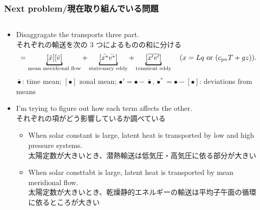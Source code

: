 \documentclass[aspectratio=149,9pt,fleqn,tbtags]{beamer}
\newcommand{\jp}[1]{{\footnotesize #1}}
\begin{document}
\begin{frame}
	\frametitle{Next problem/現在取り組んでいる問題}
	\begin{columns}[T]
		\begin{column}{\textwidth}
			\begin{itemize}
				\item Disaggragate the transports three part.\\
					\jp{それぞれの輸送を次の 3 つによるものの和に分ける}
					\begin{gather}
						[\overline{xv}]=
						\underbracket{[\bar x][\bar v]}_{\text{mean meridional flow}}
						+\underbracket{[\bar{x^*}\bar{v^*}]}_{\text{stationary eddy}}
						+\underbracket{[\overline{x'v'}]}_{\text{transient eddy}}
						\quad\text{(\(x=Lq\) or \((c_{pn}T+gz))\)}.\notag
					\end{gather}
					\(\bar\bullet\): time mean; \([\bullet]\) zonal mean;
					\(\bullet'=\bullet-\bar\bullet, \bullet^*=\bullet-[\bullet]\): deviations from means
				\item I'm trying to figure out how each term affects the other.\\
					\jp{それぞれの項がどう影響しているか調べている}
					\begin{itemize}
						\item When solar constant is large, latent heat is transported
							by low and high pressure systems.\\
							\jp{太陽定数が大きいとき、潜熱輸送は低気圧・高気圧に依る部分が大きい}
						\item When solar consttabt is large, latent heat is transported
							by mean meridional flow.\\
							\jp{太陽定数が大きいとき、乾燥静的エネルギーの輸送は平均子午面の循環
							に依るところが大きい}
					\end{itemize}
			\end{itemize}
		\end{column}
	\end{columns}
\end{frame}
\end{document}
